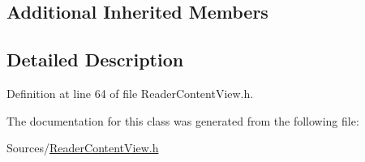 \subsection*{Additional Inherited Members}


\subsection{Detailed Description}


Definition at line 64 of file Reader\-Content\-View.\-h.



The documentation for this class was generated from the following file\-:\begin{DoxyCompactItemize}
\item 
Sources/\hyperlink{_reader_content_view_8h}{Reader\-Content\-View.\-h}\end{DoxyCompactItemize}
